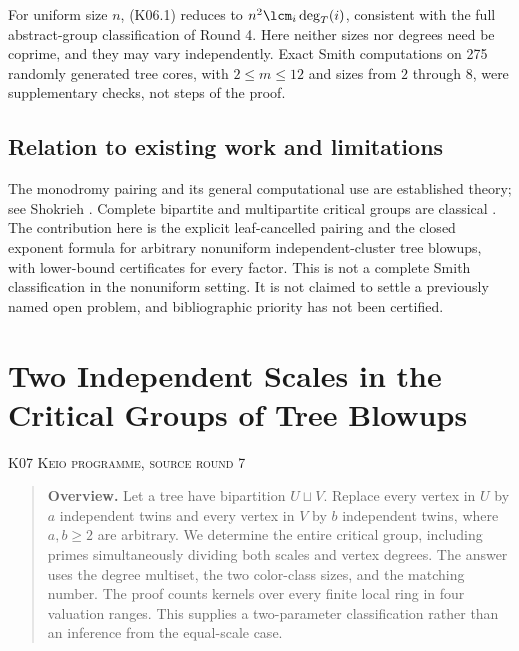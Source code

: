\documentclass[11pt,a4paper]{article}
\theoremstyle{definition}\newtheorem{definition}[theorem]{Definition}
\theoremstyle{remark}\newtheorem{remark}[theorem]{Remark}
\numberwithin{equation}{section}
\begin{document}
For uniform size $n$, (K06.1) reduces to $n^2\lcm_i\deg_T(i)$, consistent with the full abstract-group classification of Round 4. Here neither sizes nor degrees need be coprime, and they may vary independently. Exact Smith computations on 275 randomly generated tree cores, with $2\leq m\leq12$ and sizes from $2$ through $8$, were supplementary checks, not steps of the proof.

\subsection{Relation to existing work and limitations}\label{K06-sec-6}
The monodromy pairing and its general computational use are established theory; see Shokrieh \cite{ref033}. Complete bipartite and multipartite critical groups are classical \cite{ref032}. The contribution here is the explicit leaf-cancelled pairing and the closed exponent formula for arbitrary nonuniform independent-cluster tree blowups, with lower-bound certificates for every factor. This is not a complete Smith classification in the nonuniform setting. It is not claimed to settle a previously named open problem, and bibliographic priority has not been certified.




\clearpage
\section[K07 --- Two Independent Scales in the Critical Groups of Tree Blowups]{Two Independent Scales in the Critical Groups of Tree Blowups}\label{contrib-K07}
\noindent\textsc{K07 \quad Keio programme, source round 7}\par\medskip


\begin{quote}\small\textbf{Overview.} Let a tree have bipartition $U\sqcup V$. Replace every vertex in $U$ by $a$ independent twins and every vertex in $V$ by $b$ independent twins, where $a,b\geq2$ are arbitrary. We determine the entire critical group, including primes simultaneously dividing both scales and vertex degrees. The answer uses the degree multiset, the two color-class sizes, and the matching number. The proof counts kernels over every finite local ring in four valuation ranges. This supplies a two-parameter classification rather than an inference from the equal-scale case.\end{quote}
\end{document}
